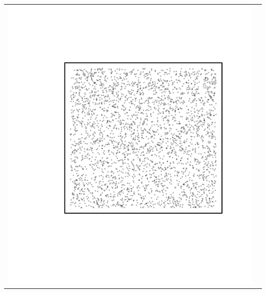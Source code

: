 \documentclass{article}\usepackage{graphicx, color}
\makeatletter
\def\maxwidth{ %
  \ifdim\Gin@nat@width>\linewidth
    \linewidth
  \else
    \Gin@nat@width
  \fi
}
\newenvironment{knitrout}{}{} %
\makeatother
\begin{document}

\vspace*{-1in}
\begin{tabular}{cc}
\begin{knitrout}
\definecolor{shadecolor}{rgb}{0.969, 0.969, 0.969}\color{fgcolor}\includegraphics[width=\maxwidth]{figure/unnamed-chunk-1} 
\end{knitrout}


\end{tabular}
\end{document}
